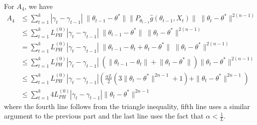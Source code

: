 \documentclass[a4paper]{article}
\newcommand{\norm}[1]{\|#1 \|}
\newcommand{\thetastar}{\theta^*}
\newcommand{\constLPH}[1]{L_{PH}^{(#1)}}
\newcommand{\stepsize}{\alpha}
\begin{document}
	For $A_{4}$, we have
	\begin{align*}
		A_{4} & \leq \sum_{t = 1}^{k}| \gamma_{t} - \gamma_{t - 1}| \; \norm{\theta_{t - 1} - \thetastar} \norm{P_{\theta_{t - 1}}\hat{g}\left(\theta_{t - 1}, X_{t}\right)} \; \norm{\theta_{t} - \thetastar}^{2(n - 1)}\\
		& \leq \sum_{t = 1}^{k}\constLPH{0}| \gamma_{t} - \gamma_{t - 1}| \; \norm{\theta_{t - 1} - \thetastar} \; \norm{\theta_{t} - \thetastar}^{2(n - 1)}\\
		& = \sum_{t = 1}^{k}\constLPH{0}|\gamma_{t} - \gamma_{t - 1}| \; \norm{\theta_{t - 1} - \theta_{t} + \theta_{t} - \thetastar} \; \norm{\theta_{t} - \thetastar}^{2(n - 1)}\\
		& \leq \sum_{t = 1}^{k}\constLPH{0}|\gamma_{t} - \gamma_{t - 1}| \;\left(\norm{\theta_{t - 1} - \theta_{t}} +‌ \norm{\theta_{t} - \thetastar}\right)\norm{\theta_{t} - \thetastar}^{2(n - 1)}\\
		& \leq \sum_{t = 1}^{k}\constLPH{0}|\gamma_{t} - \gamma_{t - 1}|\left(\frac{\stepsize L}{2}\left(3\norm{\theta_{t} - \thetastar}^{2n - 1} + 1\right) + \norm{\theta_{t} - \thetastar}^{2n - 1}\right)\\
		& \leq \sum_{t = 1}^{k}4\constLPH{0}|\gamma_{t} - \gamma_{t - 1}|\norm{\theta_{t} - \thetastar}^{2n - 1}
	\end{align*}
	where the fourth line follows from the triangle inequality, fifth line uses a similar argument to the previous part and the last line uses the fact that $\stepsize < \frac{1}{L}$.
	
\end{document}
